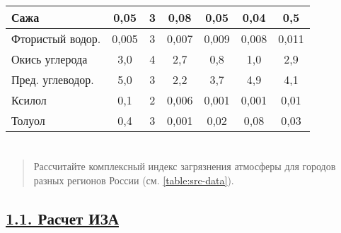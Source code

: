 \begin{table}[H]
\begin{tabularx}{\linewidth}{|L|C|C|C|C|C|C|}
        Сажа                  & 0,05              & 3 & 0,08                & 0,05              & 0,04                & 0,5                 \\ \hline
        Фтористый водор.      & 0,005             & 3 & 0,007               & 0,009             & 0,008               & 0,011               \\ \hline
        Окись углерода        & 3,0               & 4 & 2,7                 & 0,8               & 1,0                 & 2,9                 \\ \hline
        Пред. углеводор.      & 5,0               & 3 & 2,2                 & 3,7               & 4,9                 & 4,1                 \\ \hline
        Ксилол                & 0,1               & 2 & 0,006               & 0,001             & 0,001               & 0,01                \\ \hline
        Толуол                & 0,4               & 3 & 0,001               & 0,02              & 0,08                & 0,03                \\ \hline
    \end{tabularx}
\end{table}


\section*{  }
\begin{quote}
    Рассчитайте комплексный индекс загрязнения атмосферы для городов разных регионов России (см. \cref{table:src-data}). 
\end{quote}

\subsection*{\underline{1.1. Расчет ИЗА}}

